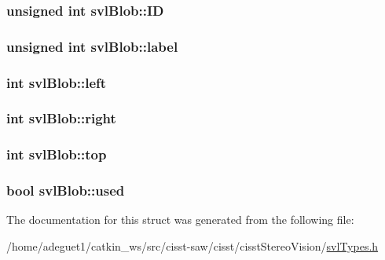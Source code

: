\hypertarget{structsvl_blob_a5174e92930ddfc63cbf0f76c304277ed}{
\subsubsection[{I\-D}]{\setlength{\rightskip}{0pt plus 5cm}unsigned int svl\-Blob\-::\-I\-D}}\label{structsvl_blob_a5174e92930ddfc63cbf0f76c304277ed}
\hypertarget{structsvl_blob_a8c07b58d3ca8fa083d94f705c1b518c0}{
\subsubsection[{label}]{\setlength{\rightskip}{0pt plus 5cm}unsigned int svl\-Blob\-::label}}\label{structsvl_blob_a8c07b58d3ca8fa083d94f705c1b518c0}
\hypertarget{structsvl_blob_a1abceb138580922b5858370101e0ee81}{
\subsubsection[{left}]{\setlength{\rightskip}{0pt plus 5cm}int svl\-Blob\-::left}}\label{structsvl_blob_a1abceb138580922b5858370101e0ee81}
\hypertarget{structsvl_blob_a49a7d67d8af30cb95f4ff0cef20d8dde}{
\subsubsection[{right}]{\setlength{\rightskip}{0pt plus 5cm}int svl\-Blob\-::right}}\label{structsvl_blob_a49a7d67d8af30cb95f4ff0cef20d8dde}
\hypertarget{structsvl_blob_a6f36e9987b39314c8d8e77070f5c4ae8}{
\subsubsection[{top}]{\setlength{\rightskip}{0pt plus 5cm}int svl\-Blob\-::top}}\label{structsvl_blob_a6f36e9987b39314c8d8e77070f5c4ae8}
\hypertarget{structsvl_blob_a08ce50cc736dfb4bdcd8a14c4e4831a5}{
\subsubsection[{used}]{\setlength{\rightskip}{0pt plus 5cm}bool svl\-Blob\-::used}}\label{structsvl_blob_a08ce50cc736dfb4bdcd8a14c4e4831a5}


The documentation for this struct was generated from the following file\-:\begin{DoxyCompactItemize}
\item 
/home/adeguet1/catkin\-\_\-ws/src/cisst-\/saw/cisst/cisst\-Stereo\-Vision/\hyperlink{svl_types_8h}{svl\-Types.\-h}\end{DoxyCompactItemize}
